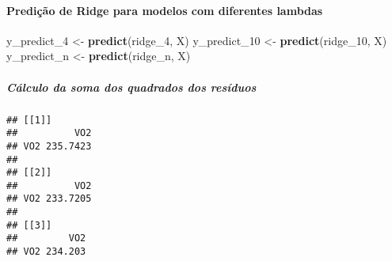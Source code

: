 \documentclass[]{article}
\newenvironment{Shaded}{\begin{snugshade}}{\end{snugshade}}
\newcommand{\DecValTok}[1]{\textcolor[rgb]{0.00,0.00,0.81}{#1}}
\newcommand{\KeywordTok}[1]{\textcolor[rgb]{0.13,0.29,0.53}{\textbf{#1}}}
\newcommand{\NormalTok}[1]{#1}
\newcommand{\OperatorTok}[1]{\textcolor[rgb]{0.81,0.36,0.00}{\textbf{#1}}}
\newcommand{\StringTok}[1]{\textcolor[rgb]{0.31,0.60,0.02}{#1}}
\let\oldparagraph\paragraph
\renewcommand{\paragraph}[1]{\oldparagraph{#1}\mbox{}}
\let\oldsubparagraph\subparagraph
\renewcommand{\subparagraph}[1]{\oldsubparagraph{#1}\mbox{}}
\begin{document}
\hypertarget{prediuxe7uxe3o-de-ridge-para-modelos-com-diferentes-lambdas}{%
\paragraph{Predição de Ridge para modelos com diferentes
lambdas}\label{prediuxe7uxe3o-de-ridge-para-modelos-com-diferentes-lambdas}}

\begin{Shaded}
\begin{Highlighting}[]
\NormalTok{y_predict_}\DecValTok{4}\NormalTok{ <-}\StringTok{ }\KeywordTok{predict}\NormalTok{(ridge_}\DecValTok{4}\NormalTok{, X)}
\NormalTok{y_predict_}\DecValTok{10}\NormalTok{ <-}\StringTok{ }\KeywordTok{predict}\NormalTok{(ridge_}\DecValTok{10}\NormalTok{, X)}
\NormalTok{y_predict_n <-}\StringTok{ }\KeywordTok{predict}\NormalTok{(ridge_n, X)}
\end{Highlighting}
\end{Shaded}

\hypertarget{cuxe1lculo-da-soma-dos-quadrados-dos-resuxedduos}{%
\subparagraph{Cálculo da soma dos quadrados dos
resíduos}\label{cuxe1lculo-da-soma-dos-quadrados-dos-resuxedduos}}

\begin{Shaded}
\end{Shaded}

\begin{verbatim}
## [[1]]
##          VO2
## VO2 235.7423
## 
## [[2]]
##          VO2
## VO2 233.7205
## 
## [[3]]
##         VO2
## VO2 234.203
\end{verbatim}
\end{document}
